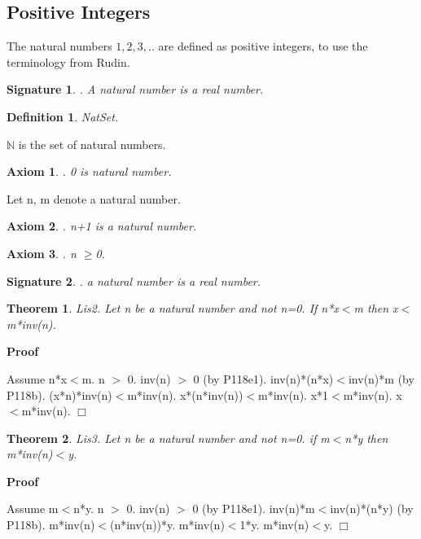 \documentclass{article}
\newenvironment{forthel}{\begin{leftbar}}{\end{leftbar}}
\newenvironment{proof}{\noindent\textbf{Proof\ }}{\hspace*{\fill}$\Box$\medskip}
\newtheorem{axiom}{Axiom}
\newtheorem{theorem}{Theorem}
\newtheorem{definition}{Definition}
\newtheorem{signature}{Signature}
\begin{document}
\subsection{Positive Integers}
The natural numbers $1,2,3,..$ are defined as positive integers, to use the terminology from Rudin.
\begin{forthel}
	\begin{signature}. A natural number is a real number.

\end{signature}
	
	\begin{definition} NatSet.

\end{definition}
	$\mathbb{N}$ is the set of natural numbers.
	
	\begin{axiom}. 0 is natural number.

\end{axiom}
	Let n, m denote a natural number.
	\begin{axiom}. n+1 is a natural number.

\end{axiom}
	\begin{axiom}. n $\geq$0.

\end{axiom}
	
	\begin{signature}. a natural number is a real number.

\end{signature}
	
	

	
	\begin{theorem}
 Lis2. Let n be a natural number and not n=0. If n*x$<$m then x$<$m*inv(n).
\end{theorem}	\begin{proof}

	Assume n*x$<$m.
	n $>$ 0.
	inv(n) $>$ 0 (by P118e1).
	inv(n)*(n*x)$<$inv(n)*m (by P118b).
	(x*n)*inv(n)$<$m*inv(n).
	x*(n*inv(n))$<$m*inv(n).
	x*1$<$m*inv(n).
	x$<$m*inv(n).
	\end{proof}

	\begin{theorem}
 Lis3. Let n be a natural number and not n=0. if m$<$n*y then m*inv(n)$<$y.
\end{theorem}	\begin{proof}

	Assume m$<$n*y.
	n $>$ 0.
	inv(n) $>$ 0 (by P118e1).
	inv(n)*m$<$inv(n)*(n*y) (by P118b).
	m*inv(n)$<$(n*inv(n))*y.
	m*inv(n)$<$1*y.
	m*inv(n)$<$y.
	\end{proof}

\end{forthel}
\end{document}

